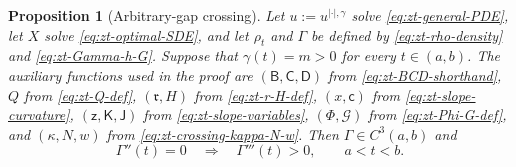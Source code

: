 \documentclass[10pt]{amsart}
\newtheorem{proposition}[proposition]{Proposition}
\theoremstyle{definition}
\theoremstyle{remark}
\numberwithin{equation}{section}
\newcommand{\1}{\mathbf 1}
\newcommand{\cG}{\mathcal G}
\begin{document}
\begin{proposition}[Arbitrary-gap crossing]
\label{prop:zt-crossing}
Let $u:=u^{|\cdot|,\gamma}$ solve \eqref{eq:zt-general-PDE}, let $X$ solve \eqref{eq:zt-optimal-SDE}, and let $\rho_t$ and $\Gamma$ be defined by \eqref{eq:zt-rho-density} and \eqref{eq:zt-Gamma-h-G}. Suppose that $\gamma(t)=m>0$ for every $t\in(a,b)$. The auxiliary functions used in the proof are $(\mathsf B,\mathsf C,\mathsf D)$ from \eqref{eq:zt-BCD-shorthand}, $Q$ from \eqref{eq:zt-Q-def}, $(\mathfrak r,H)$ from \eqref{eq:zt-r-H-def}, $(x,\mathsf c)$ from \eqref{eq:zt-slope-curvature}, $(\mathsf z,\mathsf K,\mathsf J)$ from \eqref{eq:zt-slope-variables}, $(\Phi,\cG)$ from \eqref{eq:zt-Phi-G-def}, and $(\kappa,N,w)$ from \eqref{eq:zt-crossing-kappa-N-w}. Then $\Gamma\in C^3(a,b)$ and
\begin{equation}
 \Gamma''(t)=0\quad\Longrightarrow\quad\Gamma'''(t)>0,
 \qquad a<t<b.
 \label{eq:zt-crossing-rule}
\end{equation}
\end{proposition}
\end{document}
